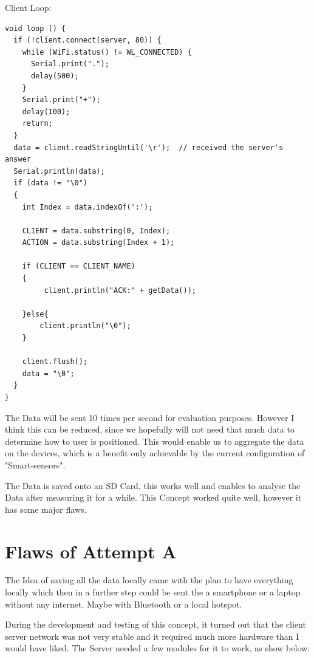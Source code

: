 Client Loop:

\begin{lstlisting}
void loop () {
  if (!client.connect(server, 80)) {
    while (WiFi.status() != WL_CONNECTED) {
      Serial.print(".");
      delay(500);
    }
    Serial.print("+");
    delay(100);
    return;
  }
  data = client.readStringUntil('\r');  // received the server's answer
  Serial.println(data);
  if (data != "\0")
  {
    int Index = data.indexOf(':');

    CLIENT = data.substring(0, Index);
    ACTION = data.substring(Index + 1);

    if (CLIENT == CLIENT_NAME)
    {
         client.println("ACK:" + getData());
      
    }else{
        client.println("\0");
    }

    client.flush();
    data = "\0";
  }
}
\end{lstlisting}
\cite{ESP32Ser71:online}

The Data will be sent 10 times per second for evaluation purposes. 
However I think this can be reduced, since we hopefully will not need that much data to determine how to user is positioned. This would enable us to aggregate the data on the devices, which is a benefit only achievable by the current configuration of "Smart-sensors".

The Data is saved onto an SD Card, this works well and enables to analyse the Data after measuring it for a while. This Concept worked quite well, however it has some major flaws. 

\section{Flaws of Attempt A}

The Idea of saving all the data locally came with the plan to have everything locally which then in a further step could be sent the a smartphone or a laptop without any internet. Maybe with Bluetooth or a local hotspot. 

During the development and testing of this concept, it turned out that the client server network was not very stable and it required much more hardware than I would have liked. 
The Server needed a few modules for it to work, as show below:


